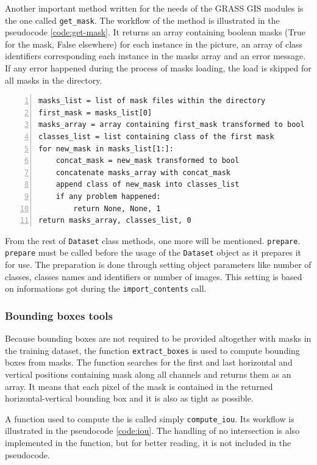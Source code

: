 Another important method written for the needs of the GRASS GIS modules is the one called \verb|get_mask|. The workflow of the method is illustrated in the pseudocode \ref{code:get-mask}. It returns an array containing boolean masks (True for the mask, False elsewhere) for each instance in the picture, an array of class identifiers corresponding each instance in the masks array and an error message. If any error happened during the process of masks loading, the load is skipped for all masks in the directory.

{\scriptsize
\begin{lstlisting}[style=python, caption={get\_mask}, captionpos=b, label=code:get-mask, deletekeywords={class},
backgroundcolor = \color{light-gray}, numbers=left, breaklines=true]
masks_list = list of mask files within the directory
first_mask = masks_list[0]
masks_array = array containing first_mask transformed to bool
classes_list = list containing class of the first mask
for new_mask in masks_list[1:]:
    concat_mask = new_mask transformed to bool
    concatenate masks_array with concat_mask
    append class of new_mask into classes_list
    if any problem happened:
        return None, None, 1
return masks_array, classes_list, 0
\end{lstlisting}}

From the rest of \verb|Dataset| class methods, one more will be mentioned. \verb|prepare|. \verb|prepare| must be called before the usage of the \verb|Dataset| object as it prepares it for use. The preparation is done through setting object parameters like number of classes, classes names and identifiers or number of images. This setting is based on informations got during the \verb|import_contents| call.

\subsubsection{Bounding boxes tools}
\label{bbox-funcs}

Because bounding boxes are not required to be provided altogether with masks in the training dataset, the function \verb|extract_boxes| is used to compute bounding boxes from masks. The function searches for the first and last horizontal and vertical positions containing mask along all channels and returns them as an array. It means that each pixel of the mask is contained in the returned horizontal-vertical bounding box and it is also as tight as possible.

A function used to compute the  is called simply \verb|compute_iou|. Its workflow is illustrated in the pseudocode \ref{code:iou}. The handling of no intersection is also implemented in the function, but for better reading, it is not included in the pseudocode.

